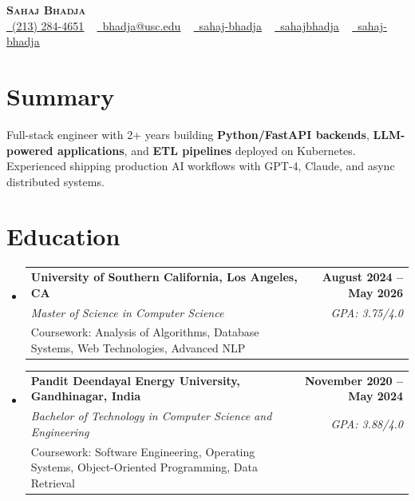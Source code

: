 \documentclass[letterpaper,10pt]{article}
\makeatletter
\newcommand{\resumeEduSubheading}[5]{\vspace{-1pt}\item\begin{tabular*}{1.0\textwidth}[t]{l@{\extracolsep{\fill}}r}\textbf{#1} & \textbf{\small #2} \\\textit{\small #3} & \textit{\small #4} \\\small #5 & \\\end{tabular*}\vspace{-4pt}}
\newcommand{\resumeSubHeadingListStart}{\begin{itemize}[leftmargin=0.0in, label={}]}
\newcommand{\resumeSubHeadingListEnd}{\end{itemize}}
\makeatother
\begin{document}
\begin{center}
{\Huge \scshape \textbf{Sahaj Bhadja}} \\ \vspace{1pt}
\small \href{tel:(213) 284-4651}{\faPhone\ \underline{(213) 284-4651}} ~ \href{mailto:bhadja@usc.edu}{\raisebox{-0.2\height}\faEnvelope\ \underline{bhadja@usc.edu}} ~
\href{https://www.linkedin.com/in/sahaj-bhadja/}{\raisebox{-0.2\height}\faLinkedin\ \underline{sahaj-bhadja}} ~ \href{https://github.com/SAHAJ-BHADJA}{\raisebox{-0.2\height}\faGithub\ \underline{sahajbhadja}} ~
\href{https://sahaj-bhadja.vercel.app/}{\raisebox{-0.2\height}\faGlobe\ \underline{sahaj-bhadja}}
\end{center}
\vspace{-18pt}
\section{Summary}
\begin{itemize}[leftmargin=0.15in, label={}]
\small{\item{Full-stack engineer with 2+ years building \textbf{Python/FastAPI backends}, \textbf{LLM-powered applications}, and \textbf{ETL pipelines} deployed on Kubernetes. Experienced shipping production AI workflows with GPT-4, Claude, and async distributed systems.}}
\end{itemize}
\vspace{-16pt}
\section{Education}
\resumeSubHeadingListStart
\resumeEduSubheading{University of Southern California, Los Angeles, CA}{August 2024 -- May 2026}{Master of Science in Computer Science}{GPA: 3.75/4.0}{Coursework: Analysis of Algorithms, Database Systems, Web Technologies, Advanced NLP}
\vspace{-9pt}
\resumeEduSubheading{Pandit Deendayal Energy University, Gandhinagar, India}{November 2020 -- May 2024}{Bachelor of Technology in Computer Science and Engineering}{GPA: 3.88/4.0}{Coursework: Software Engineering, Operating Systems, Object-Oriented Programming, Data Retrieval}
\resumeSubHeadingListEnd
\vspace{-14pt}
\end{document}
